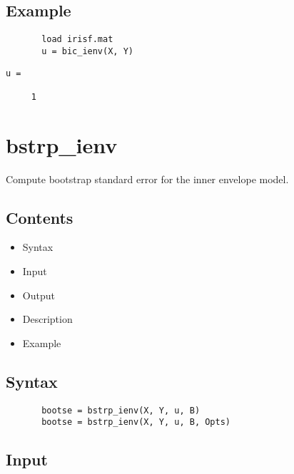 \documentclass[a4paper,11pt,openany]{memoir}
\begin{document}
\subsection*{Example}


\begin{verbatim}       load irisf.mat
       u = bic_ienv(X, Y)\end{verbatim}
    
        \color{lightgray}\ttfamily \begin{verbatim}
u =

     1

\end{verbatim} \rmfamily
\color{black}

\newpage

\rmfamily
\color{black}\section{bstrp\_ienv}

\begin{par}
Compute bootstrap standard error for the inner envelope model.
\end{par} \vspace{1em}

\subsection*{Contents}

\begin{itemize}
\setlength{\itemsep}{-1ex}
   \item Syntax
   \item Input
   \item Output
   \item Description
   \item Example
\end{itemize}


\subsection*{Syntax}


\begin{verbatim}       bootse = bstrp_ienv(X, Y, u, B)
       bootse = bstrp_ienv(X, Y, u, B, Opts)\end{verbatim}
    

\subsection*{Input}
\end{document}
